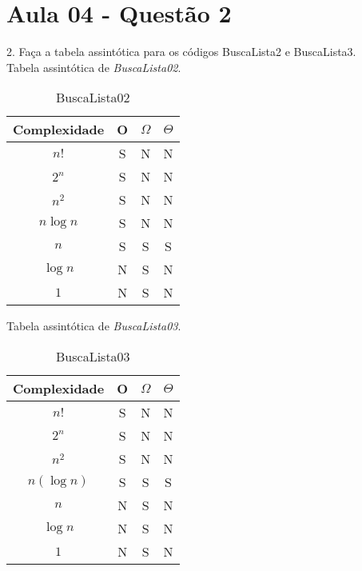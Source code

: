 \section{Aula 04 - Questão 2}
2. Faça a tabela assintótica para os códigos BuscaLista2 e BuscaLista3. \\

Tabela assintótica de \textit{BuscaLista02}. 

\begin{table}[ht!]
    \centering
    \begin{tabular}{|c|c|c|c|}
    \hline
    \textbf{Complexidade} & \textbf{O} & $\Omega$ & $\Theta$ \\ \hline
    $n!$ & S & N & N \\ \hline
    $2^n$ & S & N & N \\ \hline
    $n^2$ & S & N & N \\ \hline
    $n\log n$ & S & N & N \\ \hline
    $n$ & S & S & S \\ \hline
    $\log n$ & N & S & N \\ \hline
    $1$ & N & S & N \\ \hline 
    \end{tabular}
    \caption{BuscaLista02}
\end{table}

Tabela assintótica de \textit{BuscaLista03}. 

\begin{table}[ht!]
    \centering
    \begin{tabular}{|c|c|c|c|}
    \hline
    \textbf{Complexidade} & \textbf{O} & $\Omega$ & $\Theta$ \\ \hline
    $n!$ & S & N & N \\ \hline
    $2^n$ & S & N & N \\ \hline
    $n^2$ & S & N & N \\ \hline
    $n(\log n)$ & S & S & S \\ \hline
    $n$ & N & S & N \\ \hline
    $\log n$ & N & S & N \\ \hline
    $1$ & N & S & N \\ \hline 
    \end{tabular}
    \caption{BuscaLista03}
\end{table}
